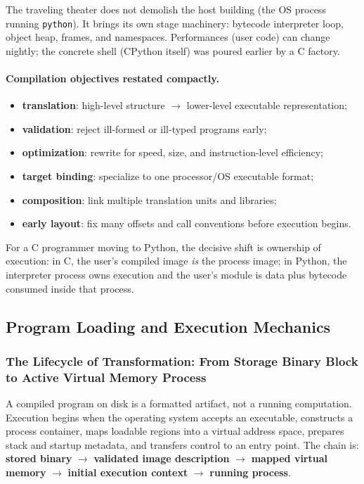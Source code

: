 \documentclass[a4paper,twoside]{report}
\begin{document}
The traveling theater does not demolish the host building (the OS process running \texttt{python}). It brings its own stage machinery: bytecode interpreter loop, object heap, frames, and namespaces. Performances (user code) can change nightly; the concrete shell (CPython itself) was poured earlier by a C factory.

\paragraph{Compilation objectives restated compactly.}
\begin{itemize}
    \item \textbf{translation}: high-level structure $\rightarrow$ lower-level executable representation;
    \item \textbf{validation}: reject ill-formed or ill-typed programs early;
    \item \textbf{optimization}: rewrite for speed, size, and instruction-level efficiency;
    \item \textbf{target binding}: specialize to one processor/OS executable format;
    \item \textbf{composition}: link multiple translation units and libraries;
    \item \textbf{early layout}: fix many offsets and call conventions before execution begins.
\end{itemize}

For a C programmer moving to Python, the decisive shift is ownership of execution: in C, the user's compiled image \emph{is} the process image; in Python, the interpreter process owns execution and the user's module is data plus bytecode consumed inside that process.


\subsection{Program Loading and Execution Mechanics}

\subsubsection{The Lifecycle of Transformation: From Storage Binary Block to Active Virtual Memory Process}

A compiled program on disk is a formatted artifact, not a running computation. Execution begins when the operating system accepts an executable, constructs a process container, maps loadable regions into a virtual address space, prepares stack and startup metadata, and transfers control to an entry point. The chain is: \textbf{stored binary} $\rightarrow$ \textbf{validated image description} $\rightarrow$ \textbf{mapped virtual memory} $\rightarrow$ \textbf{initial execution context} $\rightarrow$ \textbf{running process}.
\end{document}
